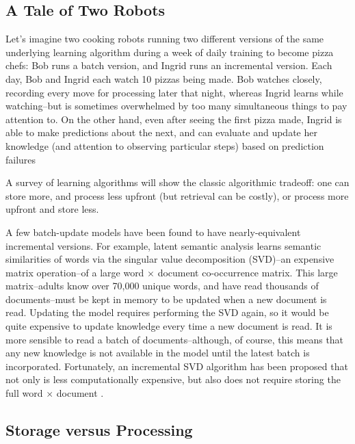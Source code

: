 \documentclass[10pt,letterpaper]{article}
\begin{document}
\subsection{A Tale of Two Robots}

Let's imagine two cooking robots running two different versions of the same underlying learning algorithm during a week of daily training to become pizza chefs: Bob runs a batch version, and Ingrid runs an incremental version. Each day, Bob and Ingrid each watch 10 pizzas being made. Bob watches closely, recording every move for processing later that night, whereas Ingrid learns while watching--but is sometimes overwhelmed by too many simultaneous things to pay attention to. On the other hand, even after seeing the first pizza made, Ingrid is able to make predictions about the next, and can evaluate and update her knowledge (and attention to observing particular steps) based on prediction failures %

A survey of learning algorithms will show the classic algorithmic tradeoff: one can store more, and process less upfront (but retrieval can be costly), or process more upfront and store less.

A few batch-update models have been found to have nearly-equivalent incremental versions. For example, latent semantic analysis \cite[LSA]{Deerwester:1990} learns semantic similarities of words via the singular value decomposition (SVD)--an expensive matrix operation--of a large word $\times$ document co-occurrence matrix. This large matrix--adults know over 70,000 unique words, and have read thousands of documents--must be kept in memory to be updated when a new document is read. Updating the model requires performing the SVD again, so it would be quite expensive to update knowledge every time a new document is read. It is more sensible to read a batch of documents--although, of course, this means that any new knowledge is not available in the model until the latest batch is incorporated. Fortunately, an incremental SVD algorithm has been proposed that not only is less computationally expensive, but also does not require storing the full word $\times$ document \cite{Sarwar:2002}.

\subsection{Storage versus Processing}
\end{document}
